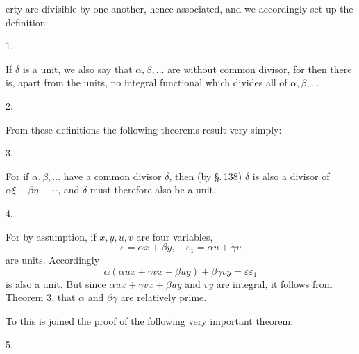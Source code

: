 erty are divisible by one another, hence associated, and we accordingly set up the definition:

1. 

If $\delta$ is a unit, we also say that $\alpha, \beta, \dots$ are without common divisor, for then there is, apart from the units, no integral functional which divides all of $\alpha, \beta, \dots$

2. 

From these definitions the following theorems result very simply:

3. 

For if $\alpha, \beta, \dots$ have a common divisor $\delta$, then (by \S.\,138) $\delta$ is also a divisor of $\alpha \xi + \beta \eta + \cdots$, and $\delta$ must therefore also be a unit.

4. 

For by assumption, if $x, y, u, v$ are four variables,
\[ \varepsilon = \alpha x + \beta y, \quad \varepsilon_1 = \alpha u + \gamma v \]
are units. Accordingly
\[ \alpha (\alpha u x + \gamma v x + \beta u y) + \beta \gamma v y = \varepsilon \varepsilon_1 \]
is also a unit. But since $\alpha u x + \gamma v x + \beta u y$ and $v y$ are integral, it follows from Theorem 3. that $\alpha$ and $\beta \gamma$ are relatively prime.

To this is joined the proof of the following very important theorem:

5. 
